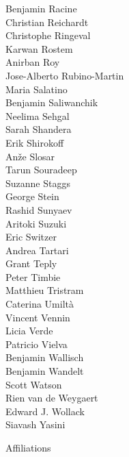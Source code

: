 \documentclass[PICOReport.tex]{subfiles}
\begin{document}
{\begin{multicols}{4}
Benjamin Racine                 \\
Christian Reichardt             \\
Christophe Ringeval             \\
Karwan Rostem                   \\
Anirban Roy                     \\
Jose-Alberto Rubino-Martin      \\
Maria Salatino                  \\
Benjamin Saliwanchik            \\
Neelima Sehgal                  \\
Sarah Shandera                  \\
Erik Shirokoff                  \\
An\v{z}e Slosar                 \\
Tarun Souradeep                 \\
Suzanne Staggs                  \\
George Stein                    \\
Rashid Sunyaev                  \\
Aritoki Suzuki                  \\
Eric Switzer                    \\
Andrea Tartari                  \\
Grant Teply                     \\
Peter Timbie                    \\
Matthieu Tristram               \\
Caterina Umilt\`{a}             \\
Vincent Vennin                  \\
Licia Verde                     \\
Patricio Vielva                 \\
Benjamin Wallisch               \\
Benjamin Wandelt                \\
Scott Watson                    \\
Rien van de Weygaert            \\
Edward J. Wollack               \\
Siavash Yasini
\end{multicols}
}

\newpage
\Large  {\centerline {Affiliations}}
\end{document}
